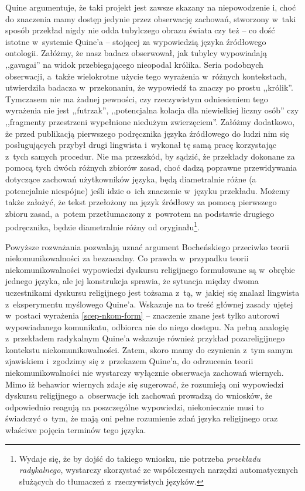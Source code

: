 Quine argumentuje, że taki projekt jest zawsze skazany na niepowodzenie i, choć do znaczenia mamy dostęp jedynie przez obserwację zachowań, stworzony w~taki sposób przekład nigdy nie odda tubylczego obrazu świata czy też -- co dość istotne w~systemie Quine'a -- stojącej za wypowiedzią języka źródłowego ontologii. Załóżmy, że nasz badacz obserwował, jak tubylcy wypowiadają ,,gavagai'' na widok przebiegającego nieopodal królika. Seria podobnych obserwacji, a~także wielokrotne użycie tego wyrażenia w~różnych kontekstach, utwierdziła badacza w~przekonaniu, że wypowiedź ta znaczy po prostu ,,królik''. Tymczasem nie ma żadnej pewności, czy rzeczywistym odniesieniem tego wyrażenia nie jest ,,futrzak'', ,,potencjalna kolacja dla niewielkiej liczny osób'' czy ,,fragmenty przestrzeni wypełnione niedużym zwierzęciem''. Załóżmy dodatkowo, że przed publikacją pierwszego podręcznika języka źródłowego do ludzi nim się posługujących przybył drugi lingwista i~wykonał tę samą pracę korzystając z~tych samych procedur. Nie ma przeszkód, by sądzić, że przekłady dokonane za pomocą tych dwóch różnych zbiorów zasad, choć dadzą poprawne przewidywania dotyczące zachowań użytkowników języka, będą diametralnie różne (a potencjalnie niespójne) jeśli idzie o~ich znaczenie w~języku przekładu. Możemy także założyć, że tekst przełożony na język źródłowy za pomocą pierwszego zbioru zasad, a~potem przetłumaczony z~powrotem na podstawie drugiego podręcznika, będzie diametralnie różny od oryginału\footnote{Wydaje się, że by dojść do takiego wniosku, nie potrzeba \textit{przekładu radykalnego}, wystarczy skorzystać ze współczesnych narzędzi automatycznych służących do tłumaczeń z~rzeczywistych języków.}.

Powyższe rozważania pozwalają uznać argument Bocheńskiego przeciwko teorii niekomunikowalności za bezzasadny. Co prawda w~przypadku teorii niekomunikowalności wypowiedzi dyskursu religijnego formułowane są w~obrębie jednego języka, ale jej konstrukcja sprawia, że sytuacja między dwoma uczestnikami dyskursu religijnego jest tożsama z~tą, w~jakiej się znalazł lingwista z~eksperymentu myślowego Quine'a. Wskazuje na to treść głównej zasady ujętej w~postaci wyrażenia \eqref{scep-nkom-form} -- znaczenie znane jest tylko autorowi wypowiadanego komunikatu, odbiorca nie do niego dostępu. Na pełną analogię z~przekładem radykalnym Quine'a wskazuje również przykład pozareligijnego kontekstu niekomunikowalności. Zatem, skoro mamy do czynienia z~tym samym zjawiskiem i~zgodzimy się z~przekazem Quine'a, do odrzucenia teorii niekomunikowalności nie wystarczy wyłącznie obserwacja zachowań wiernych. Mimo iż behawior wiernych zdaje się sugerować, że rozumieją oni wypowiedzi dyskursu religijnego a~obserwacje ich zachowań prowadzą do wniosków, że odpowiednio reagują na poszczególne wypowiedzi, niekoniecznie musi to świadczyć o~tym, że mają oni pełne rozumienie zdań języka religijnego oraz właściwe pojęcia terminów tego języka.

